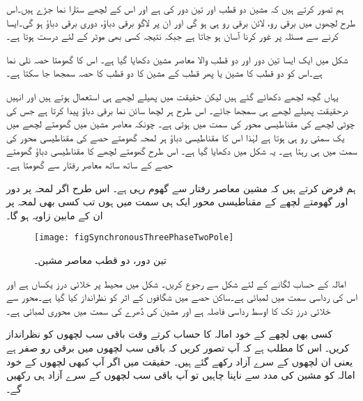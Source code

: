  ہم تصور کرتے ہیں کہ مشین دو قطب اور تین دور کی ہے اور اس کے لچھے ستارا نما جڑے  ہیں۔اس طرح لچھوں میں برقی رو، لائن برقی رو ہی ہو گی اور ان پر لاگو برقی دباؤ، دوری برقی دباؤ ہو گی۔ایسا کرنے سے مسئلہ پر غور کرنا آسان ہو جاتا ہے جبکہ نتیجہ کسی بھی موٹر کے لئے درست ہوتا ہے۔

شکل   میں ایک ایسا تین دور اور دو قطب والا معاصر مشین دکھایا گیا ہے۔ اس کا گھومتا حصہ نلی نما ہے۔اس کو دو قطب کا مشین یا پھر  قطب کے مشین کا دو قطب کا حصہ سمجھا جا سکتا ہے۔

 یہاں گچھ لچھے دکھائے گئے ہیں لیکن حقیقت میں پھیلے لچھے ہی استعمال ہوتے ہیں اور انہیں درحقیقت پھیلے لچھے ہی سمجھا جائے۔ اس طرح ہر لچھا سائن نما برقی دباؤ پیدا کرتا ہے جس کی چوٹی لچھے کی مقناطیسی محور کی سمت میں ہوتی ہے۔  چونکہ معاصر مشین میں گھومتے لچھے میں یک سمتی رو ہی ہوتا ہے لہٰذا اس کا مقناطیسی دباؤ ہر لمحہ گھومتے حصے کی مقناطیسی محور کی سمت میں ہی رہتا ہے۔ یہ شکل میں دکھایا گیا ہے۔ اس طرح گھومتے لچھے کا مقناطیسی دباؤ گھومتے حصے کے ساتھ ساتھ معاصر رفتار سے گھومتا ہے۔

ہم فرض کرتے ہیں کہ مشین معاصر رفتار  سے گھوم رہی ہے۔ اس طرح اگر لمحہ  پر دور  اور گھومتے لچھے کے مقناطیسی محور ایک ہی سمت میں ہوں تب کسی بھی لمحہ  پر ان کے مابین زاویہ  ہو گا۔
\begin{figure}
\centering
\texttt{[image: figSynchronousThreePhaseTwoPole]}
\caption{تین دور، دو قطب معاصر مشین۔}
\label{شکل_معاصر_تین_دور_دو_قطب}
\end{figure}
امالہ کے حساب لگانے کے لئے شکل   سے رجوع کریں۔ شکل میں محیط پر خلائی درز یکساں ہے  اور اس کی رداسی سمت میں لمبائی  ہے۔ساکن حصے میں شگافوں کے اثر کو نظرانداز کیا گیا ہے۔محور سے خلائی درز تک کا اوسط رداسی فاصلہ  ہے اور مشین کی دُھرے کی سمت میں محوری لمبائی  ہے۔

کسی بھی لچھے کے خود امالہ کا حساب کرتے وقت باقی سب لچھوں کو نظرانداز کریں۔ اس کا مطلب ہے کہ آپ تصور کریں کہ باقی سب لچھوں میں برقی رو صفر ہے یعنی ان لچھوں  کے سرے آزاد رکھے گئے ہیں۔ حقیقت میں اگر آپ کبھی لچھوں کے خود امالہ کو مشین کی مدد سے ناپنا چاہیں تو آپ باقی سب لچھوں کے سرے آزاد ہی رکھیں گے۔ 

